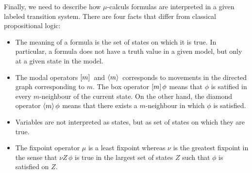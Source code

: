 Finally, we need to describe how $\mu$-calculs
formulas are interpreted in a given labeled transition system.
There are four facts that differ from classical propositional
logic:
\begin{itemize}
    \item The meaning of a formula is the set of states on which it is true.
        In particular, a formula does not have a truth value in a given model,
        but only at a given state in the model.
    \item The modal operators $[m]\,$ and $\langle m\rangle\,$ corresponds
        to movements in the directed graph corresponding to $m$.
        The box operator $[m]\, \phi$ means that $\phi$ is satified in
        every $m$-neighbour of the current state. On the other hand,
        the diamond operator $\langle m\rangle\, \phi$ means that there exists
        a $m$-neighbour in which $\phi$ is satisfied.
    \item Variables are not interpreted as states, but as set of states
        on which they are true.
    \item The fixpoint operator $\mu$ is a least fixpoint
        whereas $\nu$ is the greatest fixpoint in the sense
        that $\nu Z \, \phi$ is true in the largest set of states $Z$
        such that $\phi$ is satisfied on $Z$.
\end{itemize}

